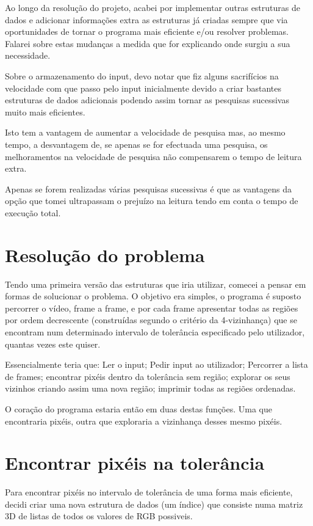 \documentclass{article}
\begin{document}
Ao longo da resolução do projeto, acabei por implementar outras estruturas de dados e adicionar informações extra as estruturas já criadas sempre que via oportunidades de tornar o programa mais eficiente e/ou resolver problemas. Falarei sobre estas mudanças a medida que for explicando onde surgiu a sua necessidade.

Sobre o armazenamento do input, devo notar que fiz alguns sacrifícios na velocidade com que passo pelo input inicialmente devido a criar bastantes estruturas de dados adicionais podendo assim tornar as pesquisas sucessivas muito mais eficientes. 

Isto tem a vantagem de aumentar a velocidade de pesquisa mas, ao mesmo tempo, a desvantagem de, se apenas se for efectuada uma pesquisa, os melhoramentos na velocidade de pesquisa não compensarem o tempo de leitura extra. 

Apenas se forem realizadas várias pesquisas sucessivas é que as vantagens da opção que tomei ultrapassam o prejuízo na leitura tendo em conta o tempo de execução total.

\pagebreak
\section{Resolução do problema}

Tendo uma primeira versão das estruturas que iria utilizar, comecei a pensar em formas de solucionar o problema. O objetivo era simples, o programa é suposto percorrer o vídeo, frame a frame, e por cada frame apresentar todas as regiões por ordem decrescente (construídas segundo o critério da 4-vizinhança) que se encontram num determinado intervalo de tolerância especificado pelo utilizador, quantas vezes este quiser. 

Essencialmente teria que: Ler o input; Pedir input ao utilizador; Percorrer a lista de frames; encontrar pixéis dentro da tolerância sem região; explorar os seus vizinhos criando assim uma nova região; imprimir todas as regiões ordenadas.

O coração do programa estaria então em duas destas funções. Uma que encontraria pixéis, outra que exploraria a vizinhança desses mesmo pixéis.

\section{Encontrar pixéis na tolerância}

Para encontrar pixéis no intervalo de tolerância de uma forma mais eficiente, decidi criar uma nova estrutura de dados (um índice) que consiste numa matriz 3D de listas de todos os valores de RGB possiveis.
\end{document}
